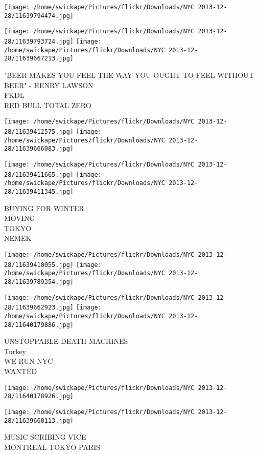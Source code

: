 \documentclass[10pt,letterpaper]{article}
\begin{document}
\texttt{[image: /home/swickape/Pictures/flickr/Downloads/NYC 2013-12-28/11639794474.jpg]}

\vspace{0.25in}
\texttt{[image: /home/swickape/Pictures/flickr/Downloads/NYC 2013-12-28/11639793724.jpg]}
\texttt{[image: /home/swickape/Pictures/flickr/Downloads/NYC 2013-12-28/11639667213.jpg]}

"BEER MAKES YOU FEEL THE WAY YOU OUGHT TO FEEL WITHOUT BEER" {-} HENRY LAWSON\\
FKDL\\
RED BULL TOTAL ZERO
\pagebreak

\texttt{[image: /home/swickape/Pictures/flickr/Downloads/NYC 2013-12-28/11639412575.jpg]}
\texttt{[image: /home/swickape/Pictures/flickr/Downloads/NYC 2013-12-28/11639666083.jpg]}

\texttt{[image: /home/swickape/Pictures/flickr/Downloads/NYC 2013-12-28/11639411665.jpg]}
\texttt{[image: /home/swickape/Pictures/flickr/Downloads/NYC 2013-12-28/11639411345.jpg]}

BUYING FOR WINTER\\
MOVING\\
TOKYO\\
NEMEK
\pagebreak

\texttt{[image: /home/swickape/Pictures/flickr/Downloads/NYC 2013-12-28/11639410055.jpg]}
\texttt{[image: /home/swickape/Pictures/flickr/Downloads/NYC 2013-12-28/11639789354.jpg]}

\texttt{[image: /home/swickape/Pictures/flickr/Downloads/NYC 2013-12-28/11639662923.jpg]}
\texttt{[image: /home/swickape/Pictures/flickr/Downloads/NYC 2013-12-28/11640179886.jpg]}

UNSTOPPABLE DEATH MACHINES\\
Turkey\\
WE RUN NYC\\
WANTED
\pagebreak

\texttt{[image: /home/swickape/Pictures/flickr/Downloads/NYC 2013-12-28/11640178926.jpg]}

\vspace{0.25in}
\texttt{[image: /home/swickape/Pictures/flickr/Downloads/NYC 2013-12-28/11639660113.jpg]}

MUSIC SCRIBING VICE\\
MONTREAL TOKYO PARIS
\pagebreak
\end{document}
